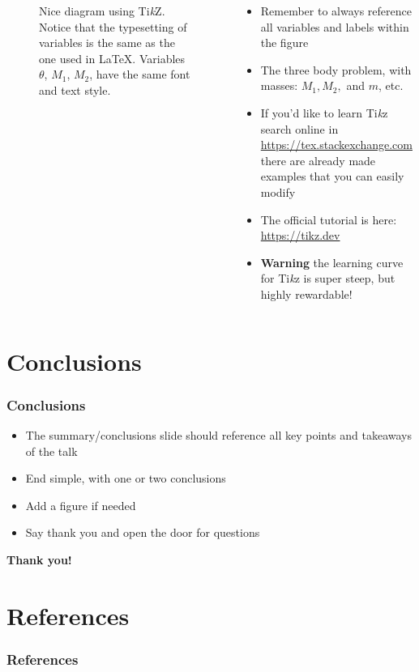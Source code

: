 \documentclass[
    10pt,
    aspectratio=169,
    xcolor={dvipsnames},
    spanish,
    ]{beamer}
\begin{document}
\begin{frame}
\begin{columns}
\begin{column}[]{0.57\textwidth}
\begin{figure}
\begin{tikzpicture}[font=\footnotesize]
        \end{tikzpicture}
        \caption{Nice diagram using Ti\textit{k}Z. Notice that the typesetting of variables is the same as the one used in \LaTeX. Variables $\theta$, $M_1$, $M_2$, have the same font and text style.}
        \label{fig:my_tikz_fig}
    \end{figure}
    \end{column}
    \begin{column}{0.43\textwidth}
      \begin{itemize}
        \item Remember to always reference all variables and labels within the figure
        \item The three body problem, with masses: $M_1, M_2,$ and $m$, etc.
        \item If you'd like to learn Ti\textit{k}z search online in \url{https://tex.stackexchange.com} there are already made examples that you can easily modify
        \item The official tutorial is here: \url{https://tikz.dev}
        \item \textbf{Warning} the learning curve for Ti\textit{k}z is super steep, but highly rewardable!
      \end{itemize}
    \end{column}
  \end{columns}

\end{frame}

\section{Conclusions}

\begin{frame}
  \frametitle{Conclusions}
  \begin{itemize}
    \item The summary/conclusions slide should reference all key points and takeaways of the talk
    \item End simple, with one or two conclusions
    \item Add a figure if needed
    \item Say thank you and open the door for questions
  \end{itemize}

  \vfill
  \begin{center}
    {\Large\textbf{Thank you!}}
  \end{center}

\end{frame}

\section{References}
\begin{frame}
    \frametitle{References}
    \footnotesize
    
    
\end{frame}
\end{document}
